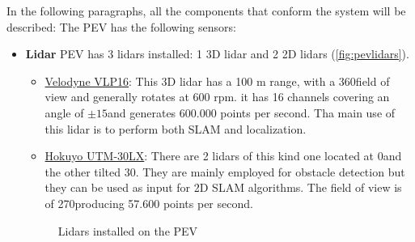 In the following paragraphs, all the components that conform the system will be described:
 The PEV has the following sensors:
\begin{itemize}
  \item \textbf{Lidar} PEV has 3 lidars installed: 1 3D lidar and 2 2D lidars (\autoref{fig:pevlidars}).
  \begin{itemize}
    \item \href{https://velodynelidar.com/vlp-16.html}{Velodyne VLP16}: This 3D lidar has a 100 m range, with a 360\textdegree field of view and generally rotates at 600 rpm. it has 16 channels covering an angle of $\pm 15$\textdegree and generates 600.000 points per second. Tha main use of this lidar is to perform both SLAM and localization.

    \item \href{https://www.hokuyo-aut.jp/search/single.php?serial=169}{Hokuyo UTM-30LX}: There are 2 lidars of this kind one located at 0\textdegree and the other tilted 30\textdegree. They are mainly employed for obstacle detection but they can be used as input for 2D SLAM algorithms. The field of view is of 270\textdegree producing  57.600 points per second.
  \end{itemize}
  \begin{figure}[ht]
    \centering
     \qquad
    \caption{Lidars installed on the PEV}
    \label{fig:pevlidars}
  \end{figure}


\end{itemize}
